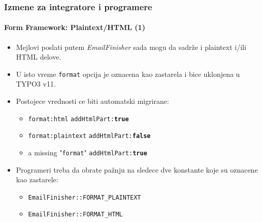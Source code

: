 
\begin{frame}[fragile]
	\frametitle{Izmene za integratore i programere}
	\framesubtitle{Form Framework: Plaintext/HTML (1)}

	\begin{itemize}
		\item Mejlovi poslati putem  \textit{EmailFinisher} sada mogu da sadrže i plaintext i/ili HTML delove.

		\item U isto vreme \texttt{format} opcija je oznacena kao zastarela i bice uklonjena u TYPO3 v11.

		\item Postojece vrednosti ce biti automatski migrirane:

			\begin{itemize}\smaller
				\item \texttt{format:html} \tabto{3cm}\textrightarrow\hspace{0.1cm}\texttt{addHtmlPart:\textbf{true}}
				\item \texttt{format:plaintext} \tabto{3cm}\textrightarrow\hspace{0.1cm}\texttt{addHtmlPart:\textbf{false}}
				\item a missing "\texttt{format}" \tabto{3cm}\textrightarrow\hspace{0.1cm}\texttt{addHtmlPart:\textbf{true}}
			\end{itemize}\normalsize

		\item Programeri treba da obrate pažnju na sledece dve konstante koje su oznacene
		kao zastarele:

			\begin{itemize}\smaller
				\item \texttt{EmailFinisher::FORMAT\_PLAINTEXT}
				\item \texttt{EmailFinisher::FORMAT\_HTML}
			\end{itemize}\normalsize

	\end{itemize}

\end{frame}


